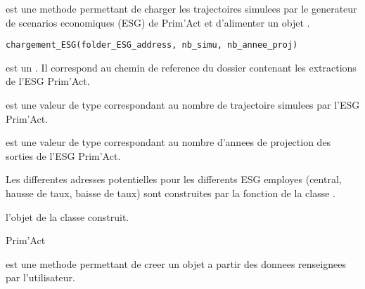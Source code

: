 \documentclass[a4paper]{book}
\begin{document}
%
\begin{Description}\relax
{} est une methode permettant de charger les trajectoires simulees par le generateur de
scenarios economiques (ESG) de Prim'Act et d'alimenter un objet .
\end{Description}
%
\begin{Usage}
\begin{verbatim}
chargement_ESG(folder_ESG_address, nb_simu, nb_annee_proj)
\end{verbatim}
\end{Usage}
%
\begin{Arguments}
\begin{ldescription}
\item[\code{folder\_ESG\_address}] est un . Il correspond au chemin de reference du dossier contenant
les extractions de l'ESG Prim'Act.

\item[\code{nb\_simu}] est une valeur de type  correspondant au nombre de trajectoire
simulees par l'ESG Prim'Act.

\item[\code{nb\_annee\_proj}] est une valeur de type  correspondant au nombre d'annees de projection
des sorties de l'ESG Prim'Act.
\end{ldescription}
\end{Arguments}
%
\begin{Details}\relax
Les differentes adresses potentielles pour les differents ESG employes (central, hausse de taux, baisse de taux)
sont construites par la fonction  de la classe .
\end{Details}
%
\begin{Value}
 l'objet de la classe  construit.
\end{Value}
%
\begin{Author}\relax
Prim'Act
\end{Author}
%
\begin{Description}\relax
{} est une methode permettant de creer un objet  a partir des donnees renseignees par l'utilisateur.
\end{Description}
\end{document}
